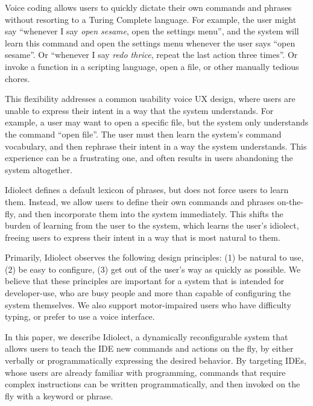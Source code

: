 \documentclass[conference]{IEEEtran}
\begin{document}

Voice coding allows users to quickly dictate their own commands and phrases without resorting to a Turing Complete language. For example, the user might say ``whenever I say \textit{open sesame}, open the settings menu'', and the system will learn this command and open the settings menu whenever the user says ``open sesame''. Or ``whenever I say \textit{redo thrice}, repeat the last action three times''. Or invoke a function in a scripting language, open a file, or other manually tedious chores.

This flexibility addresses a common usability voice UX design, where users are unable to express their intent in a way that the system understands. For example, a user may want to open a specific file, but the system only understands the command ``open file''. The user must then learn the system's command vocabulary, and then rephrase their intent in a way the system understands. This experience can be a frustrating one, and often results in users abandoning the system altogether.

Idiolect defines a default lexicon of phrases, but does not force users to learn them. Instead, we allow users to define their own commands and phrases on-the-fly, and then incorporate them into the system immediately. This shifts the burden of learning from the user to the system, which learns the user's idiolect, freeing users to express their intent in a way that is most natural to them.

Primarily, Idiolect observes the following design principles: (1) be natural to use, (2) be easy to configure, (3) get out of the user's way as quickly as possible. We believe that these principles are important for a system that is intended for developer-use, who are busy people and more than capable of configuring the system themselves. We also support motor-impaired users who have difficulty typing, or prefer to use a voice interface.

In this paper, we describe Idiolect, a dynamically reconfigurable system that allows users to teach the IDE new commands and actions on the fly, by either verbally or programmatically expressing the desired behavior. By targeting IDEs, whose users are already familiar with programming, commands that require complex instructions can be written programmatically, and then invoked on the fly with a keyword or phrase.
\end{document}
